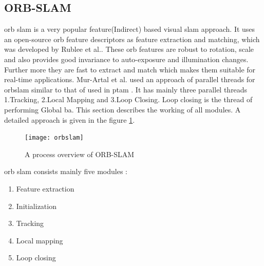 \subsection{ORB-SLAM}
\acrshort{orb} \acrshort{slam} is a very popular feature(Indirect) based visual \acrshort{slam} approach. It uses an open-source \acrshort{orb} feature descriptors as feature extraction and matching, which was developed by Rublee et al.\cite{ORB}. These \acrshort{orb} features are robust to rotation, scale and also provides good invariance to auto-exposure and illumination changes. Further more they are fast to extract and match which makes them suitable for real-time applications\cite{Mur-Artal}. Mur-Artal et al. \cite{Mur-Artal} used an approach of parallel threads for \acrshort{orb}\acrshort{slam} similar to that of used in \acrshort{ptam} \cite{4538852}. It has mainly three parallel threads 1.Tracking, 2.Local Mapping and 3.Loop Closing. Loop closing is the thread of performing Global \acrshort{ba}. This section describes the working of all modules. A detailed approach is given in the figure \ref{fig:orbslam}.
\begin{figure}[h]
	\centering
	\texttt{[image: orbslam]}
	\caption{A process overview of ORB-SLAM \cite{Mur-Artal}}
	\label{fig:orbslam}
\end{figure}
\newline
\acrshort{orb} \acrshort{slam} consists mainly five modules :
\begin{enumerate}
	\item Feature extraction 
	\item Initialization
	\item Tracking
	\item Local mapping
	\item Loop closing
\end{enumerate}	

